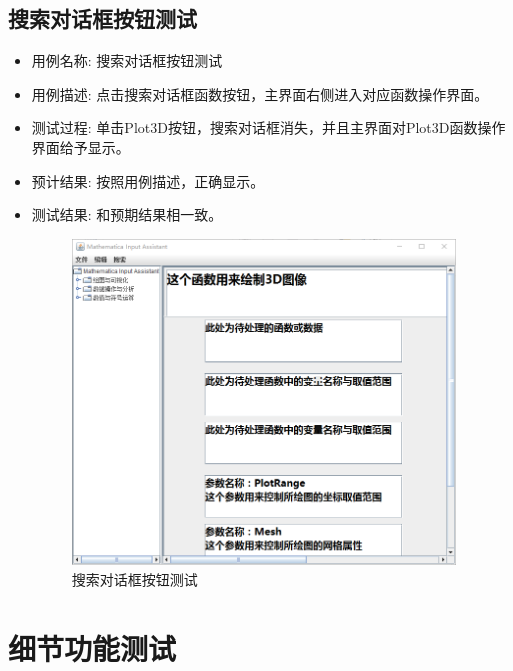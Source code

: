 \documentclass[hyperref, UTF8
,bookmarksnumbered=true, oneside]{ctexbook}
\begin{document}

		\subsection{搜索对话框按钮测试} %
		\begin{itemize}
			\item 用例名称: 搜索对话框按钮测试
			\item 用例描述: 点击搜索对话框函数按钮，主界面右侧进入对应函数操作界面。
			\item 测试过程: 单击Plot3D按钮，搜索对话框消失，并且主界面对Plot3D函数操作界面给予显示。
			\item 预计结果: 按照用例描述，正确显示。
			\item 测试结果:	和预期结果相一致。

				\begin{figure}[!h]
                	\centering
                	\includegraphics[width=4in]{20.png}
                	\caption{搜索对话框按钮测试}    
                	\label{pic:MathObject}
            	\end{figure}

		\end{itemize}
		
	

	\section{细节功能测试} %
\end{document}
